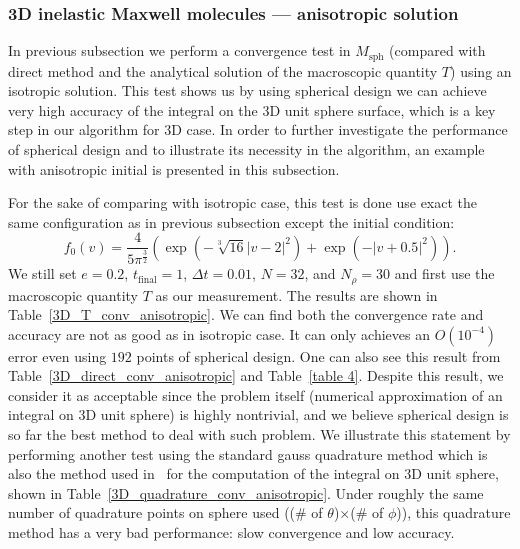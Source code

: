 \documentclass[review,times]{elsarticle}
\begin{document}
{\color{blue} \subsubsection{3D inelastic Maxwell molecules  --- anisotropic solution}

In previous subsection we perform a convergence test in $M_\text{sph}$ (compared with direct method and the analytical solution of the macroscopic quantity $T$) using an isotropic solution. This test shows us by using spherical design we can achieve very high accuracy of the integral on the 3D unit sphere surface, which is a key step in our algorithm for 3D case. In order to further investigate the performance of spherical design and to illustrate its necessity in the algorithm, an example with anisotropic initial is presented in this subsection.

For the sake of comparing with isotropic case, this test is done use exact the same configuration as in previous subsection except the initial condition:
\begin{equation}\label{3D_anisotropic}
  f_0(v) = \frac{4}{5\pi^{\frac{3}{2}}}\left(\exp(-\sqrt[3]{16}|v-2|^2) + \exp(-|v+0.5|^2)\right).
\end{equation}
We still set $e=0.2$, $t_\text{final} = 1$, $\Delta t = 0.01$, $N = 32$, and $N_{\rho}=30$ and first use the macroscopic quantity $T$ as our measurement. The results are shown in Table~\ref{3D_T_conv_anisotropic}. We can find both the convergence rate and accuracy are not as good as in isotropic case. It can only achieves an $O(10^{-4})$ error even using $192$ points of spherical design. One can also see this result from Table~\ref{3D_direct_conv_anisotropic} and Table~\ref{table 4}. Despite this result, we consider it as acceptable since the problem itself (numerical approximation of an integral on 3D unit sphere) is highly nontrivial, and we believe spherical design is so far the best method to deal with such problem. We illustrate this statement by performing another test using the standard gauss quadrature method which is also the method used in~\cite{WU201566} for the computation of the integral on 3D unit sphere, shown in Table~\ref{3D_quadrature_conv_anisotropic}. Under roughly the same number of quadrature points on sphere used \big((\# of $\theta$)$\times$(\# of $\phi$)\big), this quadrature method has a very bad performance: slow convergence and low accuracy.
}
\end{document}
